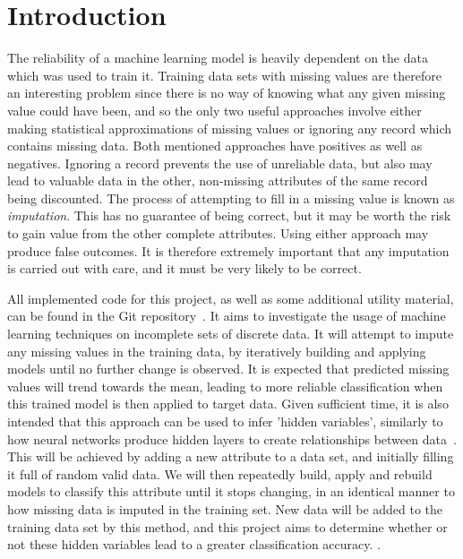 \newpage
\chapter{Introduction}\label{intro}
The reliability of a machine learning model is heavily dependent on the data which was used to train it. Training data sets with missing values are therefore an interesting problem since there is no way of knowing what any given missing value could have been, and so the only two useful approaches involve either making statistical approximations of missing values or ignoring any record which contains missing data. Both mentioned approaches have positives as well as negatives. Ignoring a record prevents the use of unreliable data, but also may lead to valuable data in the other, non-missing attributes of the same record being discounted. The process of attempting to fill in a missing value is known as \textit{imputation}. This has no guarantee of being correct, but it may be worth the risk to gain value from the other complete attributes.  Using either approach may produce false outcomes. It is therefore extremely important that any imputation is carried out with care, and it must be very likely to be correct.

All implemented code for this project, as well as some additional utility material, can be found in the Git repository~\cite{gitlab}. It aims to investigate the usage of machine learning techniques on incomplete sets of discrete data. It will attempt to impute any missing values in the training data, by iteratively building and applying models until no further change is observed. It is expected that predicted missing values will trend towards the mean, leading to more reliable classification when this trained model is then applied to target data.  Given sufficient time, it is also intended that this approach can be used to infer 'hidden variables', similarly to how neural networks produce hidden layers to create relationships between data~\cite{Touretzky:1989}. This will be achieved by adding a new attribute to a data set, and initially filling it full of random valid data. We will then repeatedly build, apply and rebuild models to classify this attribute until it stops changing, in an identical manner to how missing data is imputed in the training set. New data will be added to the training data set by this method, and this project aims to determine whether or not these hidden variables lead to a greater classification accuracy. .
